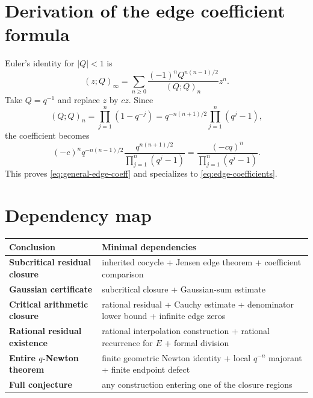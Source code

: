 \documentclass[11pt]{article}
\theoremstyle{definition}
\begin{document}
\section{Derivation of the edge coefficient formula}

Euler's identity for \(|Q|<1\) is
\[
  (z;Q)_\infty
   =\sum_{n\ge0}\frac{(-1)^nQ^{n(n-1)/2}}{(Q;Q)_n}z^n.
\]
Take \(Q=q^{-1}\) and replace \(z\) by \(cz\).  Since
\[
  (Q;Q)_n
  =\prod_{j=1}^n(1-q^{-j})
  =q^{-n(n+1)/2}\prod_{j=1}^n(q^j-1),
\]
the coefficient becomes
\[
  (-c)^nq^{-n(n-1)/2}
  \frac{q^{n(n+1)/2}}{\prod_{j=1}^n(q^j-1)}
  =\frac{(-cq)^n}{\prod_{j=1}^n(q^j-1)}.
\]
This proves \eqref{eq:general-edge-coeff} and specializes to \eqref{eq:edge-coefficients}.

\section{Dependency map}

\begin{center}
\begin{tabularx}{\textwidth}{>{\bfseries}l X}
\toprule
Conclusion & Minimal dependencies\\
\midrule
Subcritical residual closure & inherited cocycle + Jensen edge theorem + coefficient comparison\\
Gaussian certificate & subcritical closure + Gaussian-sum estimate\\
Critical arithmetic closure & rational residual + Cauchy estimate + denominator lower bound + infinite edge zeros\\
Rational residual existence & rational interpolation construction + rational recurrence for \(E\) + formal division\\
Entire \(q\)-Newton theorem & finite geometric Newton identity + local \(q^{-n}\) majorant + finite endpoint defect\\
Full conjecture & any construction entering one of the closure regions\\
\bottomrule
\end{tabularx}
\end{center}
\end{document}
